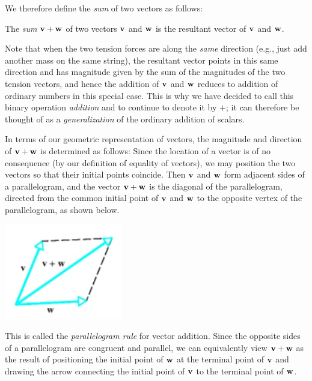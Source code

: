 \documentclass[12pt,letterpaper,reqno]{article}
\numberwithin{equation}{section}
\newcommand{\ti}[1]{\textit{#1}}
\begin{document}
 We therefore define the \emph{sum} of two vectors as follows:
 
 \begin{defn}
 	The \ti{sum} ${\bf v}+{\bf w}$ of two vectors ${\bf v}$ and ${\bf w}$ is the resultant vector of ${\bf v}$ and ${\bf w}$.
 \end{defn}
Note that when the two tension forces are along the \emph{same} direction (e.g., just add another mass on the same string), the resultant vector points in this same direction and has magnitude given by the sum of the magnitudes of the two tension vectors, and hence the addition of ${\bf v}$ and ${\bf w}$ reduces to addition of ordinary numbers in this special case. This is why we have decided to call this binary operation \emph{addition} and to continue to denote it by $+$; it can therefore be thought of as a \emph{generalization} of the ordinary addition of scalars. 
 
In terms of our geometric representation of vectors, the magnitude and direction of ${\bf v}+{\bf w}$ is determined as follows: Since the location of a vector is of no consequence (by our definition of equality of vectors), we may position the two vectors so that their initial points coincide. Then ${\bf v}$ and ${\bf w}$ form adjacent sides of a parallelogram, and the vector ${\bf v}+{\bf w}$ is the diagonal of the parallelogram, directed from the common initial point of ${\bf v}$ and ${\bf w}$ to the opposite vertex of the parallelogram, as shown below.	
\begin{center}
	\includegraphics[scale=0.5]{figures_mvc/parallelogram_rule}
\end{center}
This is called the \ti{parallelogram rule} for vector addition. Since the opposite sides of a parallelogram are congruent and parallel, we can equivalently view ${\bf v}+{\bf w}$ as the result of positioning the initial point of ${\bf w}$ at the terminal point of ${\bf v}$ and drawing the arrow connecting the initial point of ${\bf v}$ to the terminal point of ${\bf w}$.
\end{document}
